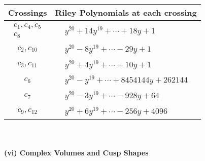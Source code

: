 \documentclass[1p]{elsarticle_modified}
\theoremstyle{definition}
\begin{document}
\begin{tabular}{m{50pt}|m{274pt}}
Crossings & \hspace{64pt}Riley Polynomials at each crossing \\
\hline $$\begin{aligned}c_{1},c_{4},c_{5}\\c_{8}\end{aligned}$$&$\begin{aligned}
&y^{20}+14 y^{19}+\cdots+18 y+1
\end{aligned}$\\
\hline $$\begin{aligned}c_{2},c_{10}\end{aligned}$$&$\begin{aligned}
&y^{20}-8 y^{19}+\cdots-29 y+1
\end{aligned}$\\
\hline $$\begin{aligned}c_{3},c_{11}\end{aligned}$$&$\begin{aligned}
&y^{20}+4 y^{19}+\cdots+10 y+1
\end{aligned}$\\
\hline $$\begin{aligned}c_{6}\end{aligned}$$&$\begin{aligned}
&y^{20}- y^{19}+\cdots+8454144 y+262144
\end{aligned}$\\
\hline $$\begin{aligned}c_{7}\end{aligned}$$&$\begin{aligned}
&y^{20}-3 y^{19}+\cdots-928 y+64
\end{aligned}$\\
\hline $$\begin{aligned}c_{9},c_{12}\end{aligned}$$&$\begin{aligned}
&y^{20}+6 y^{19}+\cdots-256 y+4096
\end{aligned}$\\
\hline
\end{tabular}\\~\\
\newpage\flushleft \textbf{(vi) Complex Volumes and Cusp Shapes}
\end{document}
